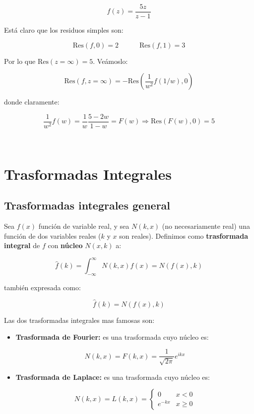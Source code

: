 \documentclass[12pt]{book}
\newcommand{\Res}{\mathrm{Res}}
\newcommand{\hatf}{\widehat{f}}
\begin{document}
$$ f(z) = \frac{5 z}{z-1} $$

Está claro que los residuos simples son:

$$ \Res(f,0) = 2 \quad \quad \quad \Res(f,1) = 3 $$

Por lo que $\Res(z=\infty)  = 5$. Veámoslo:

$$ \Res (f,z=\infty) = - \Res(\dfrac{1}{w^2} f(1/w),0) $$


donde claramente:

$$ \dfrac{1}{w^2} f(w) =  \dfrac{1}{w} \dfrac{5-2w}{1-w} =F(w) \Longrightarrow  \Res(F(w),0) = 5 $$


\hrulefill \\




\newpage
\chapter{Trasformadas Integrales}
\section{Trasformadas integrales general}

Sea $f(x)$ función de variable real, y sea $N(k,x)$ (no necesariamente real) una función de dos variables reales ($k$ y $x$ son reales). Definimos como \textbf{trasformada integral} de $f$ con \textbf{núcleo} $N(x,k)$ a:

\begin{equation}
\widehat{f}(k) = \int_{-\infty}^{\infty} N(k,x) f(x) = N(f(x),k)
\end{equation}

también expresada como:

\begin{equation}
\hatf (k) = N(f(x),k)
\end{equation}


Las dos trasformadas integrales mas famosas son:


\begin{itemize}
\item \textbf{Trasformada de Fourier:} es una trasformada cuyo núcleo es:

\begin{equation}
N(k,x) = F(k,x) = \dfrac{1}{\sqrt{2 \pi}} e^{ikx}
\end{equation}

\item \textbf{Trasformada de Laplace:} es una trasformada cuyo núcleo es:

\begin{equation}
N(k,x) = L(k,x) =  \left\lbrace \begin{array}{ll} 0 & x < 0 \\ e^{-kx} & x \geq 0 \end{array} \right.
\end{equation}
\end{itemize}
\end{document}
